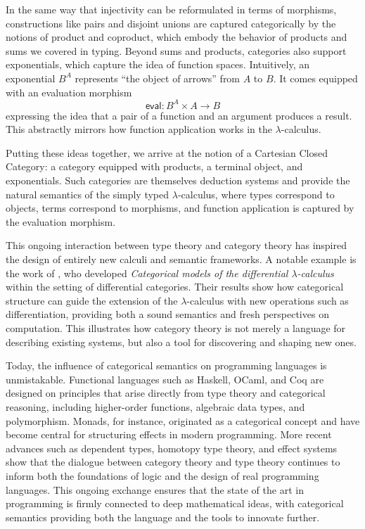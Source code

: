In the same way that injectivity can be reformulated in terms of morphisms, 
constructions like pairs and disjoint unions are captured categorically 
by the notions of product and coproduct, which embody the behavior of products and sums we
covered in typing. Beyond sums and products, categories also support exponentials, which capture the idea of function spaces. Intuitively, an exponential $B^A$ represents ``the object of arrows'' from $A$ to $B$. 
It comes equipped with an evaluation morphism
\[
   \mathsf{eval} : B^A \times A \to B
\]
expressing the idea that a pair of a function and an argument produces a result. 
This abstractly mirrors how function application works in the $\lambda$-calculus.

Putting these ideas together, we arrive at the notion of a 
Cartesian Closed Category: a category equipped with products, a terminal object, 
and exponentials. Such categories are themselves deduction systems and provide
the natural semantics of the simply typed $\lambda$-calculus, where types
correspond to objects, terms correspond to morphisms, 
and function application is captured by the evaluation morphism.

\medskip

This ongoing interaction between type theory and category theory has inspired the design 
of entirely new calculi and semantic frameworks. A notable example is the work of \cite{Cockett2019Categorical}, who developed \emph{Categorical models of the differential 
$\lambda$-calculus} within the setting of differential categories. Their results show how 
categorical structure can guide the extension of the $\lambda$-calculus with new operations 
such as differentiation, providing both a sound semantics and fresh perspectives on 
computation. This illustrates how category theory is not merely a language for 
describing existing systems, but also a tool for discovering and shaping new ones.

Today, the influence of categorical semantics on programming languages is unmistakable. 
Functional languages such as Haskell, OCaml, and Coq are designed on principles that arise 
directly from type theory and categorical reasoning, including higher-order functions, 
algebraic data types, and polymorphism. Monads, for instance, originated as a categorical 
concept and have become central for structuring effects in modern programming. 
More recent advances such as dependent types, homotopy type theory, and effect systems 
show that the dialogue between category theory and type theory continues to inform both 
the foundations of logic and the design of real programming languages. 
This ongoing exchange ensures that the state of the art in programming is firmly connected 
to deep mathematical ideas, with categorical semantics providing both the language and 
the tools to innovate further.

